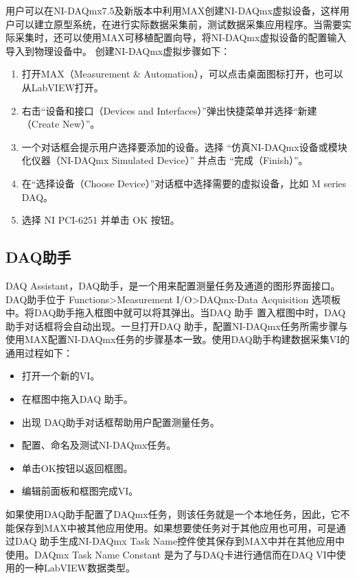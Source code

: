 用户可以在NI-DAQmx7.5及新版本中利用MAX创建NI-DAQmx虚拟设备，这样用户可以建立原型系统，在进行实际数据采集前，测试数据采集应用程序。当需要实际采集时，还可以使用MAX可移植配置向导，将NI-DAQmx虚拟设备的配置输入导入到物理设备中。
创建NI-DAQmx虚拟步骤如下：
\begin{enumerate}
\item 打开MAX（Measurement \& Automation），可以点击桌面图标打开，也可以从LabVIEW打开。

\item 右击“设备和接口（Devices and Interfaces）”弹出快捷菜单并选择“新建（Create New）”。

\item 一个对话框会提示用户选择要添加的设备。选择 “仿真NI-DAQmx设备或模块化仪器（NI-DAQmx Simulated Device）” 并点击 “完成（Finish）”。

\item 在“选择设备（Choose Device）”对话框中选择需要的虚拟设备，比如 M series DAQ。

\item 选择 NI PCI-6251 并单击 OK 按钮。
\end{enumerate}


\subsection{DAQ助手}
DAQ Assistant，DAQ助手，是一个用来配置测量任务及通道的图形界面接口。DAQ助手位于 Functions>Measurement I/O>DAQmx-Data Acquisition 选项板中。将DAQ助手拖入框图中就可以将其弹出。当DAQ 助手 置入框图中时，DAQ助手对话框将会自动出现。一旦打开DAQ 助手，配置NI-DAQmx任务所需步骤与使用MAX配置NI-DAQmx任务的步骤基本一致。使用DAQ助手构建数据采集VI的通用过程如下：
\begin{itemize}
\item 打开一个新的VI。
\item 在框图中拖入DAQ 助手。
\item 出现 DAQ助手对话框帮助用户配置测量任务。
\item 配置、命名及测试NI-DAQmx任务。
\item 单击OK按钮以返回框图。
\item 编辑前面板和框图完成VI。
\end{itemize}

如果使用DAQ助手配置了DAQmx任务，则该任务就是一个本地任务，因此，它不能保存到MAX中被其他应用使用。如果想要使任务对于其他应用也可用，可是通过DAQ 助手生成NI-DAQmx Task Name控件使其保存到MAX中并在其他应用中使用。DAQmx Task Name Constant 是为了与DAQ卡进行通信而在DAQ VI中使用的一种LabVIEW数据类型。

